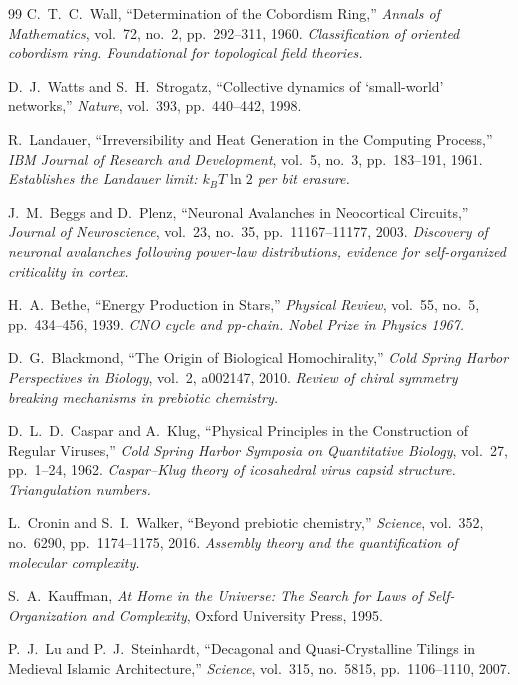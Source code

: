 \begin{thebibliography}{99}
C.~T.~C.~Wall,
``Determination of the Cobordism Ring,''
\emph{Annals of Mathematics}, vol.~72, no.~2, pp.~292--311, 1960.
\textit{Classification of oriented cobordism ring. Foundational for topological field theories.}

D.~J.~Watts and S.~H.~Strogatz,
``Collective dynamics of `small-world' networks,''
\emph{Nature}, vol.~393, pp.~440--442, 1998.

R.~Landauer,
``Irreversibility and Heat Generation in the Computing Process,''
\emph{IBM Journal of Research and Development}, vol.~5, no.~3, pp.~183--191, 1961.
\textit{Establishes the Landauer limit: $k_B T \ln 2$ per bit erasure.}

J.~M.~Beggs and D.~Plenz,
``Neuronal Avalanches in Neocortical Circuits,''
\emph{Journal of Neuroscience}, vol.~23, no.~35, pp.~11167--11177, 2003.
\textit{Discovery of neuronal avalanches following power-law distributions, evidence for self-organized criticality in cortex.}

H.~A.~Bethe,
``Energy Production in Stars,''
\emph{Physical Review}, vol.~55, no.~5, pp.~434--456, 1939.
\textit{CNO cycle and pp-chain. Nobel Prize in Physics 1967.}

D.~G.~Blackmond,
``The Origin of Biological Homochirality,''
\emph{Cold Spring Harbor Perspectives in Biology}, vol.~2, a002147, 2010.
\textit{Review of chiral symmetry breaking mechanisms in prebiotic chemistry.}

D.~L.~D.~Caspar and A.~Klug,
``Physical Principles in the Construction of Regular Viruses,''
\emph{Cold Spring Harbor Symposia on Quantitative Biology}, vol.~27, pp.~1--24, 1962.
\textit{Caspar--Klug theory of icosahedral virus capsid structure. Triangulation numbers.}

L.~Cronin and S.~I.~Walker,
``Beyond prebiotic chemistry,''
\emph{Science}, vol.~352, no.~6290, pp.~1174--1175, 2016.
\textit{Assembly theory and the quantification of molecular complexity.}

S.~A.~Kauffman,
\emph{At Home in the Universe: The Search for Laws of Self-Organization and Complexity},
Oxford University Press, 1995.

P.~J.~Lu and P.~J.~Steinhardt,
``Decagonal and Quasi-Crystalline Tilings in Medieval Islamic Architecture,''
\emph{Science}, vol.~315, no.~5815, pp.~1106--1110, 2007.


\end{thebibliography}
